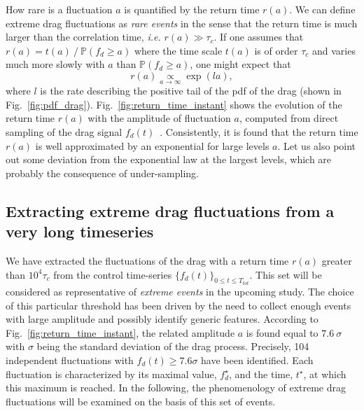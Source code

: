How rare is a fluctuation $a$ is quantified by the return time $r(a)$.
We can define extreme drag fluctuations as \textit{rare events} in the sense that the return time is much larger than the correlation time, \emph{i.e.} $r(a) \gg \tau_c$.
%
%
If one assumes that  $r(a) = t(a)~/~\mathbb{P}(f_d\geq a)$   where the time scale $t(a)$ is of order $\tau_c$ and varies much more slowly with $a$ than ${\mathbb{P}(f_d\geq a)}$,
one might expect that
\begin{equation}
  \label{eq:return_time}
  r(a) \underset{a\to\infty}{\propto} \exp(la),
\end{equation}
where $l$ is the rate describing the positive tail of the \ac{pdf} of the drag (shown in Fig.~\ref{fig:pdf_drag}).
Fig.~\ref{fig:return_time_instant} shows the evolution of the return time $r(a)$ with the amplitude of fluctuation $a$, computed from {direct sampling} of the drag signal $f_d(t)$~\citep{lestang_computing_2018}.
Consistently, it is found that the return time $r(a)$ is well approximated by an exponential for large levels $a$. Let us also point out some deviation from the exponential law at the largest levels, which are probably the consequence of under-sampling.




\subsection{Extracting extreme drag fluctuations from a very long timeseries}
\label{sec:extreme_extraction}

%
We have extracted the fluctuations of the drag with a return time $r(a)$ greater than  $10^4\tau_c$ from the control time-series $\{f_d(t)\}_{0 \leq t \leq T_{tot}}$.
This set will be considered as representative of \emph{extreme events} in the upcoming study.
The choice of this particular threshold has been driven by the need to collect enough events with large amplitude and possibly identify generic features.
%
According to Fig.~\ref{fig:return_time_instant}, the related amplitude $a$ is found equal to $7.6~\sigma$ with $\sigma$ being the standard deviation of the drag process.
Precisely, 104 independent fluctuations with $f_d(t) \geq 7.6\sigma$ have been identified. Each fluctuation is characterized by its maximal value, $f_d^{\star}$, and the time, $t^{\star}$, at which this maximum is reached.
%
In the following, the phenomenology of extreme drag fluctuations will be examined on the basis of this set of events.

